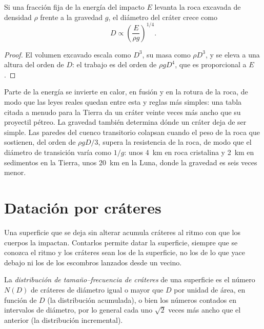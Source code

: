\begin{proposition}\label{prop:b3:planetary-interiors-surfaces:scaling}
Si una fracción fija de la energía del impacto $E$ levanta la roca excavada de
densidad $\rho$ frente a la gravedad $g$, el diámetro del cráter crece como
\[
  D \propto \left(\frac{E}{\rho g}\right)^{1/4} .
\]
\end{proposition}

\begin{proof}
El volumen excavado escala como $D^3$, su masa como $\rho D^3$, y se
eleva a una altura del orden de $D$: el trabajo es del orden de $\rho g D^4$, que
es proporcional a $E$.
\end{proof}

Parte de la energía se invierte en calor, en fusión y en la rotura de la roca, de modo que
las leyes reales quedan entre esta y reglas más simples: una tabla citada a menudo
para la Tierra da un cráter veinte veces más ancho que su
proyectil pétreo. La gravedad también determina dónde un cráter deja de ser simple. Las
paredes del cuenco transitorio colapsan cuando el peso de la roca que sostienen,
del orden de $\rho g D/3$, supera la resistencia de la roca, de modo que el
diámetro de transición varía como $1/g$: unos \qty{4}{km} en roca cristalina y
\qty{2}{km} en sedimentos en la Tierra, unos \qty{20}{km} en la
Luna, donde la gravedad es seis veces menor.

\section{Datación por cráteres}\label{sec:b3:planetary-interiors-surfaces:dating}

Una superficie que se deja sin alterar acumula cráteres al ritmo con que los cuerpos
la impactan. Contarlos permite datar la superficie, siempre que se conozca el ritmo y los
cráteres sean los de la superficie, no los de lo que yace debajo ni los de los
escombros lanzados desde un vecino.

\begin{definition}\label{def:b3:planetary-interiors-surfaces:sfd}
La \emph{distribución de tamaño--frecuencia de cráteres}
de una superficie es el número $N(D)$ de cráteres de diámetro igual o mayor que $D$ por
unidad de área, en función de $D$ (la distribución acumulada), o bien los
números contados en intervalos de diámetro, por lo general cada uno $\sqrt2$ veces más ancho que
el anterior (la distribución incremental).
\end{definition}

